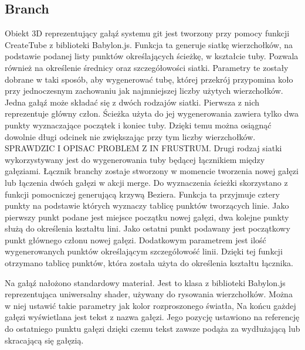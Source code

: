 \documentclass[11pt,a4paper,polish,thesis]{dcsbook}
\begin{document}
	\subsection{Branch}
	Obiekt 3D reprezentujący gałąź systemu git jest tworzony przy pomocy funkcji CreateTube z biblioteki Babylon.js. 
	Funkcja ta generuje siatkę wierzchołków, na podstawie podanej listy punktów określających ścieżkę, w kształcie tuby. Pozwala również na określenie średnicy oraz
	szczegółowości siatki. Parametry te zostały dobrane w taki sposób, aby wygenerować tubę, której przekrój przypomina koło przy jednoczesnym zachowaniu jak najmniejszej liczby użytych wierzchołków. Jedna gałąź może składać się z dwóch rodzajów siatki. Pierwsza z nich reprezentuje główny człon. Ścieżka użyta do jej wygenerowania zawiera tylko dwa punkty wyznaczające początek i koniec tuby. Dzięki temu można osiągnąć dowolnie długi odcinek nie zwiększając przy tym liczby wierzchołków. SPRAWDZIC I OPISAC PROBLEM Z IN FRUSTRUM. Drugi rodzaj siatki wykorzystywany jest do wygenerowania tuby będącej łącznikiem między gałęziami. Łącznik branchy zostaje stworzony w momencie tworzenia nowej gałęzi lub łączenia dwóch gałęzi w akcji merge. Do wyznaczenia ścieżki skorzystano z funkcji pomocniczej generującą krzywą Beziera. Funkcja ta przyjmuje cztery punkty na podstawie których wyznaczy tablicę punktów tworzących linie. Jako pierwszy punkt podane jest miejsce początku nowej gałęzi, dwa kolejne punkty służą do określenia kształtu lini. Jako ostatni punkt podawany jest początkowy punkt głównego członu nowej gałęzi. Dodatkowym parametrem jest ilość wygenerowanych punktów określającym szczegółowość linii. Dzięki tej funkcji otrzymano tablicę punktów, która została użyta do określenia kształtu łącznika.
	
	Na gałąź nałożono standardowy materiał. Jest to klasa z biblioteki Babylon.js reprezentująca uniwersalny shader, używany do rysowania wierzchołków. Można w niej ustawić takie parametry jak kolor rozproszonego światła,  
	Na końcu gażdej gałęzi wyświetlana jest tekst z nazwa gałęzi. Jego pozycję ustawiono na referencję do ostatniego punktu gałęzi dzięki czemu tekst zawsze podąża za wydłużającą lub skracającą się gałęzią. 
	
	
\end{document}
